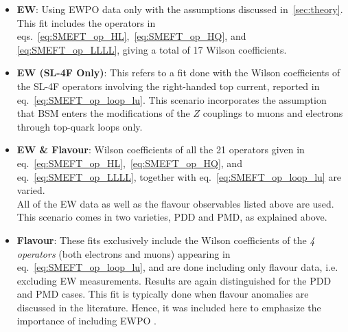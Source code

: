 \begin{itemize}
	\setlength\itemsep{0em}
	\item {\bf EW}: 
	Using EWPO data only with the assumptions discussed in~\autoref{sec:theory}. This fit includes the operators in eqs.~\eqref{eq:SMEFT_op_HL},~\eqref{eq:SMEFT_op_HQ}, and \eqref{eq:SMEFT_op_LLLL},  giving a total of 17 Wilson coefficients.
	\item  {\bf EW (SL-4F Only)}: This refers to a fit done with the Wilson coefficients of the { SL-4F operators} involving the right-handed top current, reported in eq.~\eqref{eq:SMEFT_op_loop_lu}. This scenario incorporates the assumption that BSM enters the modifications of the $Z$ couplings to muons and electrons through top-quark loops only.
	\item {\bf EW \& Flavour}: Wilson coefficients of all the { 21 operators} given in eq.~\eqref{eq:SMEFT_op_HL},~\eqref{eq:SMEFT_op_HQ}, and eq.~\eqref{eq:SMEFT_op_LLLL}, together with eq.~\eqref{eq:SMEFT_op_loop_lu} are varied.\\
   All of the EW data  as well as the flavour observables listed above are used. This scenario comes in two varieties, PDD and PMD, as explained above.
	\item {\bf Flavour}: These fits exclusively include the Wilson coefficients of the {\em 4 operators} (both electrons and muons) appearing in eq.~\eqref{eq:SMEFT_op_loop_lu}, and are done including only flavour data, i.e. excluding EW measurements. Results are again distinguished for the PDD and PMD cases. This fit is typically done when flavour anomalies are discussed in the literature. Hence, it was included here to emphasize the importance of including EWPO .
\end{itemize}
